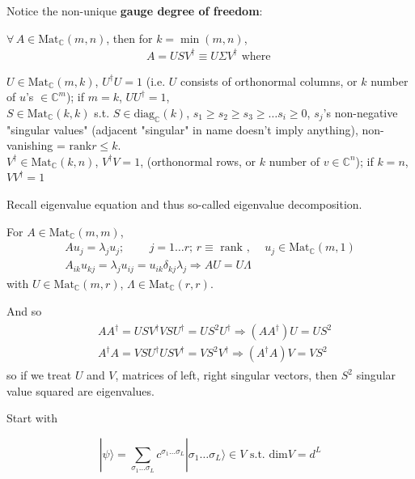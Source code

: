 Notice the non-unique \textbf{gauge degree of freedom}:

$\forall \, A \in \text{Mat}_{\mathbb{C}}(m,n)$, then for $k = \min{(m,n)}$, 
\begin{equation}
\begin{gathered}
A = U SV^{\dagger} \equiv U \Sigma V^{\dagger} \text{ where }
\end{gathered}
\end{equation}

$U \in \text{Mat}_{\mathbb{C}}(m,k)$, $U^{\dagger} U =1$ (i.e. $U$ consists of orthonormal columns, or $k$ number of $u$'s $\in \mathbb{C}^m$); if $m=k$, $UU^{\dagger} = 1$, \\
$S \in \text{Mat}_{\mathbb{C}}(k,k)$ s.t. $S \in \text{diag}_{\mathbb{C}}(k)$, $s_1 \geq s_2 \geq s_3 \geq \dots s_i \geq 0$, $s_j$'s non-negative "singular values" (adjacent "singular" in name doesn't imply anything), non-vanishing = $\text{rank} r \leq k$. \\
$V^{\dagger} \in \text{Mat}_{\mathbb{C}}(k,n)$, $V^{\dagger} V = 1$, (orthonormal rows, or $k$ number of $v\in \mathbb{C}^n$); if $k=n $, $VV^{\dagger} = 1$

Recall eigenvalue equation and thus so-called eigenvalue decomposition.

For $A \in \text{Mat}_{\mathbb{C}}(m,m)$, 
\[
\begin{gathered}
	Au_j = \lambda_j u_j ; \qquad \, j =1 \dots r ; \, r \equiv \text{ rank }, \quad \, u_j \in \text{Mat}_{\mathbb{C}}(m, 1) \\
	A_{ik} u_{kj} = \lambda_j u_{ij} = u_{ik} \delta_{kj} \lambda_j \Longrightarrow AU = U \Lambda
\end{gathered}
\]
with $U \in \text{Mat}_{\mathbb{C}}(m, r)$, $\Lambda \in \text{Mat}_{\mathbb{C}}(r, r)$.

And so
\[
\begin{gathered}
\begin{aligned}
& AA^{\dagger} = USV^{\dagger} VSU^{\dagger} = US^2 U^{\dagger} \Longrightarrow (AA^{\dagger})U = US^2 \\ 
& A^{\dagger} A = VSU^{\dagger} U SV^{\dagger} = VS^2 V^{\dagger} \Longrightarrow (A^{\dagger}A)V = VS^2
\end{aligned}
\end{gathered}
\]
so if we treat $U$ and $V$, matrices of left, right singular vectors, then $S^2$ singular value squared are eigenvalues.

Start with 

\begin{equation}
| \psi \rangle = \sum_{\sigma_1 \dots \sigma_L} c^{\sigma_1 \dots \sigma_L} | \sigma_1 \dots \sigma_L \rangle \in V \text{ s.t. } \text{dim} V = d^L
\end{equation}

